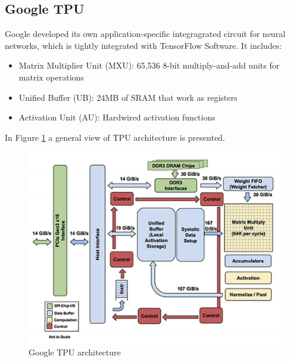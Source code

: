 \subsection{Google TPU}
Google developed its own application-specific integragrated circuit for neural networks, which is tightly integrated with TensorFlow Software.
It includes:
\begin{itemize}
\item Matrix Multiplier Unit (MXU): 65,536 8-bit multiply-and-add units for matrix operations
\item Unified Buffer (UB): 24MB of SRAM that work as registers
\item Activation Unit (AU): Hardwired activation functions
\end{itemize}

In Figure \ref{fig:tpuarch} a general view of TPU architecture is presented.
\begin{figure}[H]
\centering
\captionsetup{justification=centering}
\includegraphics[scale=0.8]{./figure/tpu_arch.PNG}
\caption{Google TPU architecture\cite{paper:40}}
\label{fig:tpuarch}
\end{figure}


